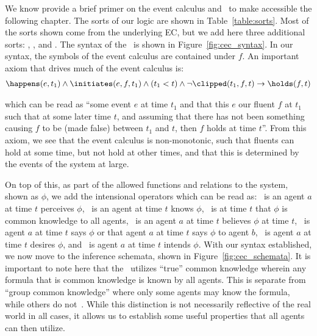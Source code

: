 We know provide a brief primer on the event calculus and \CEC\ to make
accessible the following chapter. The sorts of our logic are shown in
Table~\ref{table:sorts}. Most of the sorts shown come from the underlying EC,
but we add here three additional sorts: \Agent, \Action, and \ActionType.
The syntax of the \CEC\ is shown in Figure~\ref{fig:cec_syntax}. In our
syntax, the symbols of the event calculus are contained under $\mathit{f}$.
An important axiom that drives much of the event calculus is:
\vspace{-0.4cm}
\begin{equation*}
    \begin{aligned}
        \happens(e, t_{1}) \land \initiates(e, f, t_{1}) \land (t_{1} < t) \land \lnot\clipped(t_{1}, f, t) \rightarrow \holds(f, t)
    \end{aligned}
\end{equation*}

\noindent
which can be read as ``some event $e$ \happens at time $t_{1}$ and that this $e$
\initiates our fluent $f$ at $t_1$ such that at some later time $t$, and assuming
that there has not been something causing $f$ to be \clipped (made false) between
$t_{1}$ and $t$, then $f$ holds at time $t$''. From this axiom, we see that the
event calculus is non-monotonic, such that fluents can hold at some time, but
not hold at other times, and that this is determined by the events of the
system at large.

On top of this, as part of the allowed functions and relations to the system,
shown as $\mathit{\phi}$, we add the intensional operators which can be read as:
\perceives\ is an agent $a$ at time $t$ perceives $\mathit{\phi}$, \knows\
is an agent at time $t$ knows $\mathit{\phi}$, \common\ is at time $t$ that
$\mathit{\phi}$ is common knowledge to all agents, \believes\ is
an agent $a$ at time $t$ believes $\mathit{\phi}$ at time $t$, \says\ is
agent $a$ at time $t$ says $\mathit{\phi}$ or that agent $a$ at time $t$
says $\mathit{\phi}$ to agent $b$, \desires\ is agent $a$ at time $t$ desires
$\mathit{\phi}$, and \intends\ is agent $a$ at time $t$ intends $\mathit{\phi}$.
With our syntax established, we now move to the inference schemata, shown in
Figure~\ref{fig:cec_schemata}. It is important to note here
that the \CEC\ utilizes ``true'' common knowledge wherein any formula that is common
knowledge is known by all agents. This is separate from ``group common knowledge'' where
only some agents may know the formula, while others do not~\cite{fagin_reasoning_2004}.
While this distinction is
not necessarily reflective of the real world in all cases, it allows us to establish
some useful properties that all agents can then utilize.

